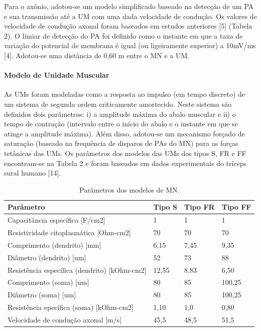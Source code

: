 Para o axônio, adotou-se um modelo simplificado baseado na detecção de um PA e sua transmissão até a UM com uma dada velocidade de condução. Os valores de velocidade de condução axonal foram baseados em estudos anteriores [5] (Tabela 2). O limiar de detecção do PA foi definido como o instante em que a taxa de variação do potencial de membrana é igual (ou ligeiramente superior) a 10mV/ms [4]. Adotou-se uma distância de 0,60 m entre o MN e a UM.

\paragraph{Modelo de Unidade Muscular}
As UMs foram modeladas como a resposta ao impulso (em tempo discreto) de um sistema de segunda ordem criticamente amortecido. Neste sistema são definidos dois parâmetros: i) a amplitude máxima do abalo muscular e ii) o tempo de contração (intervalo entre o início do abalo e o instante em que se atinge a amplitude máxima). Além disso, adotou-se um mecanismo forçado de saturação (baseado na frequência de disparos de PAs do MN) para as forças tetânicas das UMs. Os parâmetros dos modelos das UMs dos tipos S, FR e FF encontram-se na Tabela 2 e foram baseados em dados experimentais do tríceps sural humano [14].

\begin{table}[h]
 \caption{Parâmetros dos modelos de MN.}
  \centering
  \begin{tabular}{llll}
    \toprule
    Parâmetro     & Tipo S     & Tipo FR     & Tipo FF   \\
    \midrule
    Capacitância específica [F/cm2] & 1 & 1 & 1    \\
    Resistividade citoplasmática [Ohm-cm2] & 70 & 70 & 70 \\
    Comprimento (dendrito) [mm] & 6,15 & 7,45 & 9,35 \\
    Diâmetro (dendrito) [um] & 52 & 73 & 88 \\
    Resistência específica (dendrito) [kOhm-cm2] & 12,55 & 8,83 & 6,50 \\
    Comprimento (soma) [um] & 80 & 85 & 100,25 \\
    Diâmetro (soma) [um] & 80 & 85 & 100,25 \\
    Resistência epecífica (soma) [kOhm-cm2] & 1,10 & 1,0 & 0,80 \\
    Velocidade de condução axonal [m/s] & 45,5 & 48,5 & 51,5 \\
    \bottomrule
  \end{tabular}
  \label{tab:table}
\end{table}

